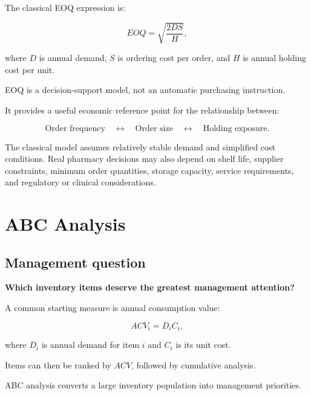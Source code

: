 \documentclass[11pt,a4paper]{article}
\begin{document}
The classical EOQ expression is:

\[
EOQ=\sqrt{\frac{2DS}{H}},
\]

where \(D\) is annual demand, \(S\) is ordering cost per order, and \(H\) is
annual holding cost per unit.

EOQ is a decision-support model, not an automatic purchasing instruction.

It provides a useful economic reference point for the relationship between:

\[
\text{Order frequency}
\quad\leftrightarrow\quad
\text{Order size}
\quad\leftrightarrow\quad
\text{Holding exposure}.
\]

The classical model assumes relatively stable demand and simplified cost
conditions. Real pharmacy decisions may also depend on shelf life, supplier
constraints, minimum order quantities, storage capacity, service requirements,
and regulatory or clinical considerations.

\section{ABC Analysis}

\subsection{Management question}

\begin{principle}[Question]
\centering
\Large \textbf{Which inventory items deserve the greatest management attention?}
\end{principle}

A common starting measure is annual consumption value:

\[
ACV_i=D_i C_i,
\]

where \(D_i\) is annual demand for item \(i\) and \(C_i\) is its unit cost.

Items can then be ranked by \(ACV\), followed by cumulative analysis.

ABC analysis converts a large inventory population into management priorities.

\begin{center}
\end{center}
\end{document}
